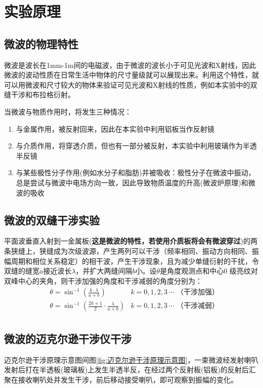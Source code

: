\documentclass[11pt]{article}
\begin{document}
	
	
	\section{实验原理}
	
	\subsection{微波的物理特性}
	微波是波长在1mm-1m间的电磁波，由于微波的波长小于可见光波和X射线，因此微波的波动性质在日常生活中物体的尺寸量级就可以展现出来。利用这个特性，就可以用微波和尺寸较大的物体来验证可见光波和X射线的性质，例如本实验中的双缝干涉和布拉格衍射。
	
	当微波与物质作用时，将发生三种情况：
	\begin{enumerate}
		\item 与金属作用，被反射回来，因此在本实验中利用铝板当作反射镜
		\item 与介质作用，将穿透介质，但也有一部分被反射，本实验中利用玻璃作为半透半反镜
		\item 与某些极性分子作用(例如水分子和脂肪)并被吸收：极性分子在微波中振动，总是尝试与微波中电场方向一致，因此导致物质温度的升高(微波炉原理)和微波的吸收
	\end{enumerate}
	
	\subsection{微波的双缝干涉实验}
	平面波垂直入射到一金属板(\textbf{这是微波的特性，若使用介质板将会有微波穿过})的两条狭缝上，狭缝成为次级波源，产生两列可以干涉（频率相同、振动方向相同、振幅周期和相位关系稳定）的相干波，产生干涉现象，且为减少单缝衍射的干扰，令双缝的缝宽$a$接近波长$\lambda$，并扩大两缝间隔$b$小。设$\theta$是角度观测点和中心$0$
	级亮纹对双峰中心的夹角，则干涉加强的角度和干涉减弱的角度分别为：
	\begin{align*}
		&\theta = \sin^{-1}{\left( \frac{k\cdot\lambda}{a+b} \right)} &k=0,1,2,3\,\cdots \text{ （干涉加强）} \\
		&\theta = \sin^{-1}{\left( \frac{2k+1}{2}\cdot\frac{\lambda}{a+b} \right)} &k=0,1,2,3\,\cdots \text{ （干涉减弱）} \\
	\end{align*}
	
	\subsection{微波的迈克尔逊干涉仪干涉}
	迈克尔逊干涉原理示意图间图\ref{fig:迈克尔逊干涉原理示意图}，一束微波经发射喇叭发射后打在半透板(玻璃板)上发生半透半反，在经过两个反射板(铝板)的反射后汇聚在接收喇叭处并发生干涉，前后移动接受喇叭，即可观察到振幅的变化。
	
\end{document}
